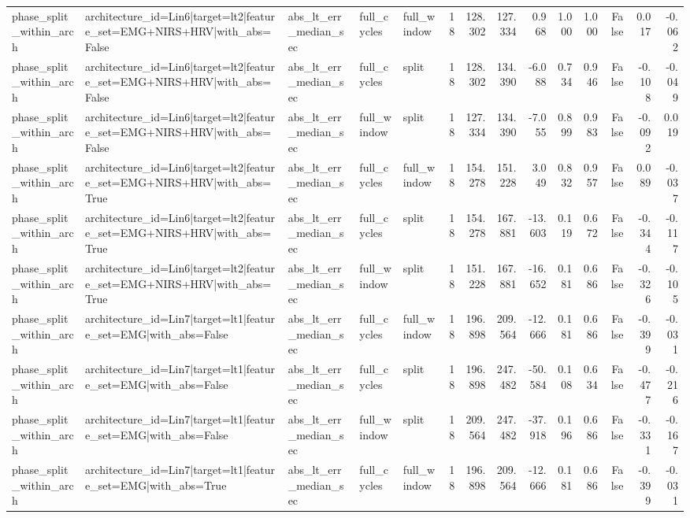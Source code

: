 \begin{table}
\begin{tabular}{lllllrrrrrrrrr}
phase_split_within_arch & architecture_id=Lin6|target=lt2|feature_set=EMG+NIRS+HRV|with_abs=False & abs_lt_err_median_sec & full_cycles & full_window & 18 & 128.302 & 127.334 & 0.968 & 1.000 & 1.000 & False & 0.017 & -0.062 \\
phase_split_within_arch & architecture_id=Lin6|target=lt2|feature_set=EMG+NIRS+HRV|with_abs=False & abs_lt_err_median_sec & full_cycles & split & 18 & 128.302 & 134.390 & -6.088 & 0.734 & 0.946 & False & -0.108 & -0.049 \\
phase_split_within_arch & architecture_id=Lin6|target=lt2|feature_set=EMG+NIRS+HRV|with_abs=False & abs_lt_err_median_sec & full_window & split & 18 & 127.334 & 134.390 & -7.055 & 0.899 & 0.983 & False & -0.092 & 0.019 \\
phase_split_within_arch & architecture_id=Lin6|target=lt2|feature_set=EMG+NIRS+HRV|with_abs=True & abs_lt_err_median_sec & full_cycles & full_window & 18 & 154.278 & 151.228 & 3.049 & 0.832 & 0.957 & False & 0.089 & -0.037 \\
phase_split_within_arch & architecture_id=Lin6|target=lt2|feature_set=EMG+NIRS+HRV|with_abs=True & abs_lt_err_median_sec & full_cycles & split & 18 & 154.278 & 167.881 & -13.603 & 0.119 & 0.672 & False & -0.344 & -0.117 \\
phase_split_within_arch & architecture_id=Lin6|target=lt2|feature_set=EMG+NIRS+HRV|with_abs=True & abs_lt_err_median_sec & full_window & split & 18 & 151.228 & 167.881 & -16.652 & 0.181 & 0.686 & False & -0.326 & -0.105 \\
phase_split_within_arch & architecture_id=Lin7|target=lt1|feature_set=EMG|with_abs=False & abs_lt_err_median_sec & full_cycles & full_window & 18 & 196.898 & 209.564 & -12.666 & 0.181 & 0.686 & False & -0.399 & -0.031 \\
phase_split_within_arch & architecture_id=Lin7|target=lt1|feature_set=EMG|with_abs=False & abs_lt_err_median_sec & full_cycles & split & 18 & 196.898 & 247.482 & -50.584 & 0.108 & 0.634 & False & -0.477 & -0.216 \\
phase_split_within_arch & architecture_id=Lin7|target=lt1|feature_set=EMG|with_abs=False & abs_lt_err_median_sec & full_window & split & 18 & 209.564 & 247.482 & -37.918 & 0.196 & 0.686 & False & -0.331 & -0.167 \\
phase_split_within_arch & architecture_id=Lin7|target=lt1|feature_set=EMG|with_abs=True & abs_lt_err_median_sec & full_cycles & full_window & 18 & 196.898 & 209.564 & -12.666 & 0.181 & 0.686 & False & -0.399 & -0.031 \\

\end{tabular}
\end{table}
